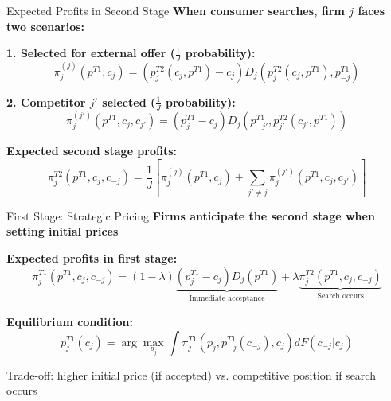 \documentclass[10pt,aspectratio=169]{beamer}
\begin{document}

\begin{frame}{Expected Profits in Second Stage}
\textbf{When consumer searches, firm $j$ faces two scenarios:}

\vspace{0.3cm}

\textbf{1. Selected for external offer ($\frac{1}{J}$ probability):}
$$\pi^{(j)}_j(p^{T1}, c_j) = (p^{T2}_j(c_j, p^{T1}) - c_j) D_j(p^{T2}_j(c_j, p^{T1}), p^{T1}_{-j})$$

\vspace{0.3cm}

\textbf{2. Competitor $j'$ selected ($\frac{1}{J}$ probability):}
$$\pi^{(j')}_j(p^{T1}, c_j, c_{j'}) = (p^{T1}_j - c_j) D_j(p^{T1}_{-j'}, p^{T2}_{j'}(c_{j'}, p^{T1}))$$

\vspace{0.5cm}

\textbf{Expected second stage profits:}
$$\pi^{T2}_j(p^{T1}, c_j, c_{-j}) = \frac{1}{J}\left[\pi^{(j)}_j(p^{T1}, c_j) + \sum_{j' \neq j} \pi^{(j')}_j(p^{T1}, c_j, c_{j'})\right]$$
\end{frame}


\begin{frame}{First Stage: Strategic Pricing}
\textbf{Firms anticipate the second stage when setting initial prices}

\vspace{0.5cm}

\textbf{Expected profits in first stage:}
$$\pi^{T1}_j(p^{T1}, c_j, c_{-j}) = (1-\lambda)\underbrace{(p^{T1}_j - c_j)D_j(p^{T1})}_{\text{Immediate acceptance}} + \lambda \underbrace{\pi^{T2}_j(p^{T1}, c_j, c_{-j})}_{\text{Search occurs}}$$

\vspace{0.5cm}

\textbf{Equilibrium condition:}
$$p^{T1}_j(c_j) = \arg\max_{p_j} \int \pi^{T1}_j(p_j, p^{T1}_{-j}(c_{-j}), c_j) dF(c_{-j}|c_j)$$

\vspace{0.3cm}
Trade-off: higher initial price (if accepted) vs. competitive position if search occurs
\end{frame}
\end{document}
